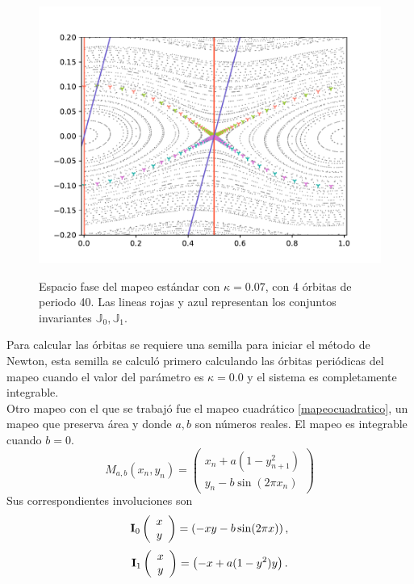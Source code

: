 \begin{figure}[H]
	\centering
	\includegraphics[scale= 0.7]{EstandarOP1-40.pdf}
	\label{orbitasp40estandar}
	\caption{Espacio fase del mapeo est\'andar con $\kappa = 0.07$, con 4  \'orbitas de periodo 40. Las lineas rojas y azul representan los conjuntos invariantes $\mathbb{J}_{0},\mathbb{J}_{1}$.}
\end{figure}

Para calcular las \'orbitas se requiere una semilla para iniciar el m\'etodo de Newton, esta semilla se calcul\'o primero calculando las \'orbitas peri\'odicas del mapeo cuando el valor del par\'ametro es $\kappa=0.0$ y el sistema es completamente integrable. \\ 

Otro mapeo con el que se trabaj\'o fue el mapeo cuadr\'atico \eqref{mapeocuadratico}, un mapeo que preserva \'area y donde $a,b$ son n\'umeros reales. El mapeo es integrable cuando $b=0$.
\begin{equation}
	M_{a,b}(x_{n},y_{n}) = \left(
	\begin{array}{c}
	x_{n}+a(1-y_{n+1}^{2})\\
	y_{n}-b\sin(2\pi x_{n})
	\end{array}
	\right)
	\label{mapeocuadratico}
\end{equation}
Sus correspondientes involuciones son
\begin{equation}
	\mathbf{I}_{0}
	\left(\begin{array}{c}
		x\\
		y
	\end{array}
	\right) = 
	\left(-x\\
	y-b\sin(2\pi x)
	\right),
	\label{involucioncuadratico0}
\end{equation}
\begin{equation}
	\mathbf{I}_{1}
	\left(\begin{array}{c}
		x\\
		y
	\end{array}
	\right) = 
	\left(-x+ a(1-y^{2})\\
	y
	\right).
	\label{involucioncuadratico1}
\end{equation}

